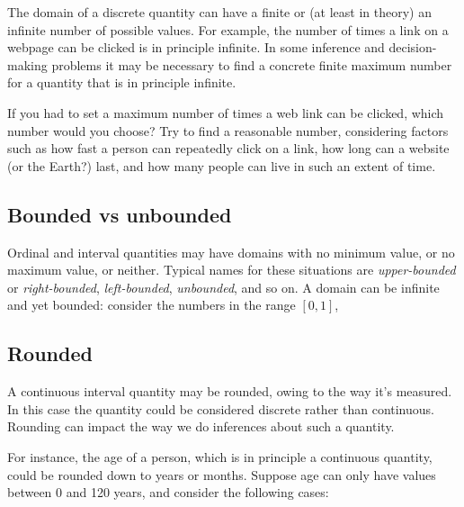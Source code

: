 \documentclass[
  a4paper,
  DIV=11,
  numbers=noendperiod,
  oneside]{scrreprt}
\begin{document}
The domain of a discrete quantity can have a finite or (at least in
theory) an infinite number of possible values. For example, the number
of times a link on a webpage can be clicked is in principle infinite. In
some inference and decision-making problems it may be necessary to find
a concrete finite maximum number for a quantity that is in principle
infinite.

\begin{tcolorbox}[enhanced jigsaw, titlerule=0mm, opacitybacktitle=0.6, toprule=.15mm, toptitle=1mm, opacityback=0, left=2mm, colframe=quarto-callout-caution-color-frame, arc=.35mm, bottomtitle=1mm, leftrule=.75mm, colbacktitle=quarto-callout-caution-color!10!white, coltitle=black, title={\faIcon{user-edit} Exercises}, rightrule=.15mm, breakable, colback=white, bottomrule=.15mm]

If you had to set a maximum number of times a web link can be clicked,
which number would you choose? Try to find a reasonable number,
considering factors such as how fast a person can repeatedly click on a
link, how long can a website (or the Earth?) last, and how many people
can live in such an extent of time.

\end{tcolorbox}

\hypertarget{bounded-vs-unbounded}{%
\subsection{Bounded vs unbounded}\label{bounded-vs-unbounded}}

Ordinal and interval quantities may have domains with no minimum value,
or no maximum value, or neither. Typical names for these situations are
\emph{upper-bounded} or \emph{right-bounded}, \emph{left-bounded},
\emph{unbounded}, and so on. A domain can be infinite and yet bounded:
consider the numbers in the range \([0,1]\),

\hypertarget{rounded}{%
\subsection{Rounded}\label{rounded}}

A continuous interval quantity may be rounded, owing to the way it's
measured. In this case the quantity could be considered discrete rather
than continuous. Rounding can impact the way we do inferences about such
a quantity.

For instance, the age of a person, which is in principle a continuous
quantity, could be rounded down to years or months. Suppose age can only
have values between 0 and 120 years, and consider the following cases:
\end{document}
